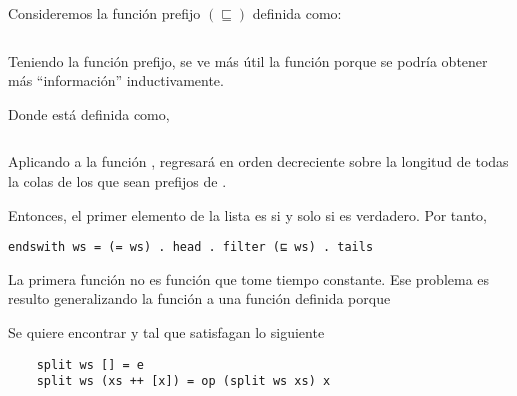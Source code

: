 

Consideremos la función prefijo $(\sqsubseteq)$ definida como:

\inputminted{haskell}{definiciones/prefix.hs}

Teniendo la función prefijo, se ve más útil la función  porque
se podría obtener más ``información'' inductivamente.

Donde  está definida como,

\inputminted{haskell}{definiciones/tails.hs}


Aplicando  a la función , regresará en orden decreciente sobre la longitud de
todas la colas de  los que sean prefijos de .


Entonces, el primer elemento de la lista es  si y solo si  es verdadero. Por tanto,

\begin{verbatim}
endswith ws = (= ws) . head . filter (⊑ ws) . tails
\end{verbatim}


La primera función  no es función que tome tiempo constante. Ese problema es resulto generalizando la función
 a una función  definida porque




Se quiere encontrar  y  tal que satisfagan lo siguiente

\begin{verbatim}
    split ws [] = e
    split ws (xs ++ [x]) = op (split ws xs) x
\end{verbatim}


%



